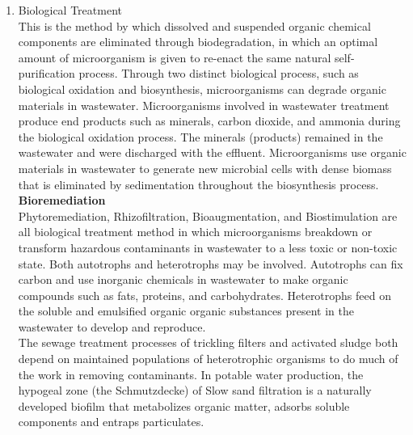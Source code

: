 \documentclass{article}
\begin{document}
\begin{enumerate}
\item Biological Treatment\\
This is the method by which dissolved and suspended organic chemical components are eliminated through biodegradation, in which an optimal amount of microorganism is given to re-enact the same natural self-purification process. Through two distinct biological process, such as biological oxidation and biosynthesis, microorganisms can degrade organic materials in wastewater. Microorganisms involved in wastewater treatment produce end products such as minerals, carbon dioxide, and ammonia during the biological oxidation process. The minerals (products) remained in the wastewater and were discharged with the effluent. Microorganisms use organic materials in wastewater to generate new microbial cells with dense biomass that is eliminated by sedimentation throughout the biosynthesis process.\\
\textbf{Bioremediation}\\
Phytoremediation, Rhizofiltration, Bioaugmentation, and Biostimulation are all biological treatment method in which microorganisms breakdown or transform hazardous contaminants in wastewater to a less toxic or non-toxic state. Both autotrophs and heterotrophs may be involved. Autotrophs can fix carbon and use inorganic chemicals in wastewater to make organic compounds such as fats, proteins, and carbohydrates. Heterotrophs feed on the soluble and emulsified organic organic substances present in the wastewater to develop and reproduce.\\
The sewage treatment processes of trickling filters and activated sludge both depend on maintained populations of heterotrophic organisms to do much of the work in removing contaminants. In potable water production, the hypogeal zone (the Schmutzdecke) of Slow sand filtration is a naturally developed biofilm that metabolizes organic matter, adsorbs soluble components and entraps particulates.
\end{enumerate}
\end{document}
